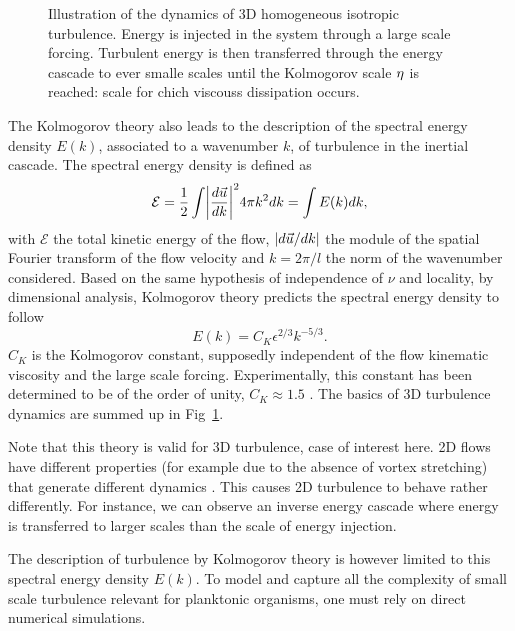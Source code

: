 \begin{figure}
	\centering
	\def\svgwidth{0.7\textwidth}
	
  	\caption[Illustration of the dynamics of 3D homogeneous isotropic turbulence.]{
  		Illustration of the dynamics of 3D homogeneous isotropic turbulence.
  		Energy is injected in the system through a large scale forcing.
  		Turbulent energy is then transferred through the energy cascade to ever smalle scales until the Kolmogorov scale $\KolmogorovScale$ is reached: scale for chich viscouss dissipation occurs.
  	}
  	\label{fig:turbulence_spectrum}
\end{figure}
The Kolmogorov theory also leads to the description of the spectral energy density $E(k)$, associated to a wavenumber $k$, of turbulence in the inertial cascade.
The spectral energy density is defined as
\begin{equation}\label{eq:spectral_density}
	\mathcal{E} = \frac{1}{2} \int \norm*{\frac{d\FlowVelocity}{dk}}^2 4\pi k^2 dk = \int E(k) dk,
\end{equation}
with $\mathcal{E}$ the total kinetic energy of the flow, $\norm*{d\FlowVelocity/dk}$ the module of the spatial Fourier transform of the flow velocity and $k = 2\pi/l$ the norm of the wavenumber considered.
Based on the same hypothesis of independence of $\nu$ and locality, by dimensional analysis, Kolmogorov theory predicts the spectral energy density to follow
\begin{equation}\label{eq:kolmogorov_spectrum}
	E(k) = C_{K} \epsilon^{2/3} k^{-5/3}.
\end{equation}
$C_{K}$ is the Kolmogorov constant, supposedly independent of the flow kinematic viscosity and the large scale forcing.
Experimentally, this constant has been determined to be of the order of unity, $C_{K} \approx 1.5$ \citep{sreenivasan1995universality}.
The basics of 3D turbulence dynamics are summed up in Fig~\ref{fig:turbulence_spectrum}.

Note that this theory is valid for 3D turbulence, case of interest here. 
2D flows have different properties (for example due to the absence of vortex stretching) that generate different dynamics .
This causes 2D turbulence to behave rather differently. 
For instance, we can observe an inverse energy cascade where energy is transferred to larger scales than the scale of energy injection.

The description of turbulence by Kolmogorov theory is however limited to this spectral energy density $E(k)$.
To model and capture all the complexity of small scale turbulence relevant for planktonic organisms, one must rely on direct numerical simulations.

